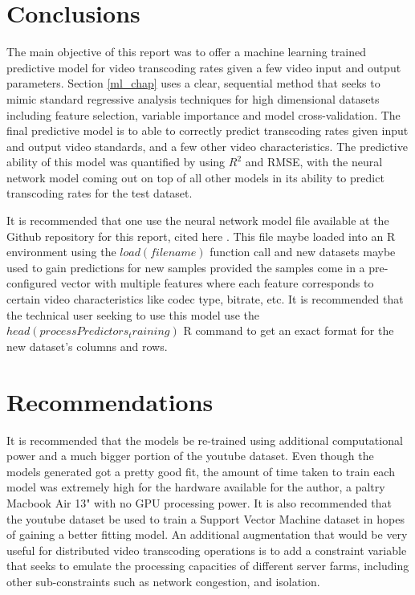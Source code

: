 \documentclass[letterpaper,12pt,titlepage,oneside,final]{report}
\begin{document}
    \section{Conclusions}
        The main objective of this report was to offer a machine learning trained predictive model for video transcoding rates given a few video input and output parameters. Section \ref{ml_chap} uses a clear, sequential method that seeks to mimic standard regressive analysis techniques for high dimensional datasets including feature selection, variable importance and model cross-validation. The final predictive model is to able to correctly predict transcoding rates given input and output video standards, and a few other video characteristics. The predictive ability of this model was quantified by using $R^2$ and RMSE, with the neural network model coming out on top of all other models in its ability to predict transcoding rates for the test dataset. 

        It is recommended that one use the neural network model file available at the Github repository for this report, cited here \cite{prajn0:online}. This file maybe loaded into an R environment using the $load(filename)$ function call and new datasets maybe used to gain predictions for new samples provided the samples come in a pre-configured vector with multiple features where each feature corresponds to certain video characteristics like codec type, bitrate, etc. It is recommended that the technical user seeking to use this model use the $head(processPredictors_training)$ R command to get an exact format for the new dataset's columns and rows.

    \section{Recommendations}
        It is recommended that the models be re-trained using additional computational power and a much bigger portion of the youtube dataset. Even though the models generated got a pretty good fit, the amount of time taken to train each model was extremely high for the hardware available for the author, a paltry Macbook Air 13" with no GPU processing power. It is also recommended that the youtube dataset be used to train a Support Vector Machine dataset in hopes of gaining a better fitting model. An additional augmentation that would be very useful for distributed video transcoding operations is to add a constraint variable that seeks to emulate the processing capacities of different server farms, including other sub-constraints such as network congestion, and isolation.
\end{document}
